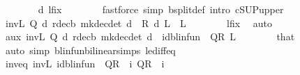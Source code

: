 \begin{isabellebody}
\ \ \ \ \ \ \isamarkupfalse%
\ d\ l{\isacharunderscore}{\kern0pt}fix\isanewline
\ \ \ \ \ \ \isamarkupfalse%
\ {\isacharparenleft}{\kern0pt}fastforce\ simp{\isacharcolon}{\kern0pt}\ {\isasymL}\isactrlsub b{\isacharunderscore}{\kern0pt}split{\isacharunderscore}{\kern0pt}def{\isacharprime}{\kern0pt}\ intro{\isacharbang}{\kern0pt}{\isacharcolon}{\kern0pt}\ cSUP{\isacharunderscore}{\kern0pt}upper{}{\isacharparenright}{\kern0pt}\isanewline
\ \ \ \ \isamarkupfalse%
\ {\isachardoublequoteopen}inv\isactrlsub L\ {\isacharparenleft}{\kern0pt}Q\ d{\isacharparenright}{\kern0pt}\ {\isacharparenleft}{\kern0pt}r{\isacharunderscore}{\kern0pt}dec\isactrlsub b\ {\isacharparenleft}{\kern0pt}mk{\isacharunderscore}{\kern0pt}dec{\isacharunderscore}{\kern0pt}det\ d{\isacharparenright}{\kern0pt}\ {\isacharplus}{\kern0pt}\ R\ d\ L{\isacharparenright}{\kern0pt}\ {\isasymle}\ L{\isachardoublequoteclose}\isanewline
\ \ \ \ \ \ \isamarkupfalse%
\ l{\isacharunderscore}{\kern0pt}fix\ \isamarkupfalse%
\ auto\isanewline
\ \ \ \ \isamarkupfalse%
\ aux{\isacharcolon}{\kern0pt}\ {\isachardoublequoteopen}inv\isactrlsub L\ {\isacharparenleft}{\kern0pt}Q\ d{\isacharparenright}{\kern0pt}\ {\isacharparenleft}{\kern0pt}r{\isacharunderscore}{\kern0pt}dec\isactrlsub b\ {\isacharparenleft}{\kern0pt}mk{\isacharunderscore}{\kern0pt}dec{\isacharunderscore}{\kern0pt}det\ d{\isacharparenright}{\kern0pt}{\isacharparenright}{\kern0pt}\ {\isasymle}\ {\isacharparenleft}{\kern0pt}id{\isacharunderscore}{\kern0pt}blinfun\ {\isacharminus}{\kern0pt}\ {\isacharquery}{\kern0pt}QR{\isacharparenright}{\kern0pt}\ L{\isachardoublequoteclose}\isanewline
\ \ \ \ \ \ \isamarkupfalse%
\ that\isanewline
\ \ \ \ \ \ \isamarkupfalse%
\ {\isacharparenleft}{\kern0pt}auto\ simp{\isacharcolon}{\kern0pt}\ blinfun{\isachardot}{\kern0pt}bilinear{\isacharunderscore}{\kern0pt}simps\ le{\isacharunderscore}{\kern0pt}diff{\isacharunderscore}{\kern0pt}eq{\isacharparenright}{\kern0pt}\isanewline
\ \ \ \ \isamarkupfalse%
\ inv{\isacharunderscore}{\kern0pt}eq{\isacharcolon}{\kern0pt}\ {\isachardoublequoteopen}inv\isactrlsub L\ {\isacharparenleft}{\kern0pt}id{\isacharunderscore}{\kern0pt}blinfun\ {\isacharminus}{\kern0pt}\ {\isacharquery}{\kern0pt}QR{\isacharparenright}{\kern0pt}\ {\isacharequal}{\kern0pt}\ {\isacharparenleft}{\kern0pt}{\isasymSum}i{\isachardot}{\kern0pt}\ {\isacharquery}{\kern0pt}QR\ {\isacharcircum}{\kern0pt}{\isacharcircum}{\kern0pt}\ i{\isacharparenright}{\kern0pt}{\isachardoublequoteclose}\isanewline

\end{isabellebody}
